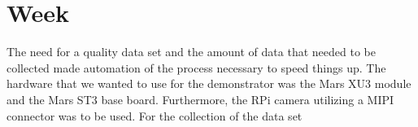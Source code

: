 \chapter{Week}
The need for a quality data set and the amount of data that needed to be collected made automation of the process necessary to speed things up. The hardware that we wanted to use for the demonstrator was the Mars XU3 module and the Mars ST3 base board. Furthermore, the RPi camera utilizing a \ac{MIPI} connector was to be used. For the collection of the data set